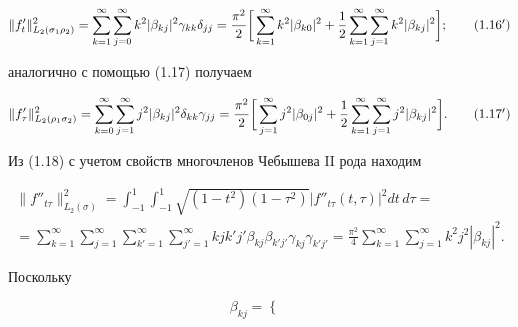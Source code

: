 \begin{pf}
\begin{equation}
\|f'_t\|_{L_2(\sigma_1\rho_2)}^2 = \suml_{k=1}^\infty\suml_{j=0}^\infty


k^2|\beta_{kj}|^2 \gamma_{kk}\delta_{jj}=


\frac{\pi^2}{2}\bigg[\suml_{k=1}^\infty k^2 |\beta_{k0}|^2 +


\frac{1}{2}\suml_{k=1}^\infty \suml_{j=1}^\infty


k^2 |\beta_{kj}|^2\bigg];


\tag{1.16$'$}


\end{equation}


аналогично с помощью (1.17) получаем


\begin{equation}


\|f'_\tau\|^2_{L_2(\rho_1\sigma_2)}=\suml_{k=0}^\infty\suml_{j=1}^\infty


j^2|\beta_{kj}|^2\delta_{kk}\gamma_{jj} = \frac{\pi^2}{2}\bigg[


\suml_{j=1}^\infty j^2|\beta_{0j}|^2 + \frac{1}{2}\suml_{k=1}^\infty


\suml_{j=1}^\infty j^2|\beta_{kj}|^2\bigg].


\tag{1.17$'$}


\end{equation}


Из (1.18) с учетом свойств многочленов Чебышева II рода находим


\begin{multline}


\|f''_{t\tau}\|^2_{L_2(\sigma)} = \int_{-1}^{1}\int_{-1}^{1}


\sqrt{(1-t^2)(1-\tau^2)}|f''_{t\tau}(t,\tau)|^2 dt\,d\tau=\\


%


=\sum_{k=1}^\infty\sum_{j=1}^\infty\sum_{k'=1}^\infty\sum_{j'=1}^\infty


kjk'j'\beta_{kj}\beta_{k'j'}\gamma_{kj}\gamma_{k'j'} =


\frac{\pi^2}{4}\sum_{k=1}^\infty \sum_{j=1}^\infty k^2 j^2 |\beta_{kj}|^2.


\tag{1.18$'$}


\end{multline}


Поскольку 


\begin{equation}


\beta_{kj} =


\begin{cases}



\end{cases}
\end{equation}
\end{pf}
